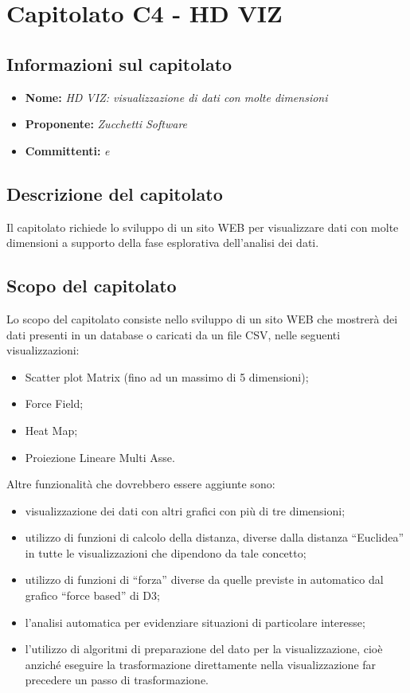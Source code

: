 \section{Capitolato C4 - HD VIZ}
\subsection{Informazioni sul capitolato}
\begin{itemize}
	\item \textbf{Nome:} \textit{HD VIZ: visualizzazione di dati con molte dimensioni}
	\item \textbf{Proponente:} \textit{Zucchetti Software}
	\item \textbf{Committenti:} \textit{\VT{} e \CR{}}
\end{itemize}

\subsection{Descrizione del capitolato}
Il capitolato richiede lo sviluppo di un sito WEB per visualizzare dati con molte dimensioni a supporto della fase esplorativa dell'analisi dei dati.

\subsection{Scopo del capitolato}
Lo scopo del capitolato consiste nello sviluppo di un sito WEB che mostrerà dei dati presenti in un database o caricati da un file CSV, nelle seguenti visualizzazioni:
\begin{itemize}
	\item Scatter plot Matrix (fino ad un massimo di 5 dimensioni);
	\item Force Field;
	\item Heat Map;
	\item Proiezione Lineare Multi Asse.
\end{itemize}
Altre funzionalità che dovrebbero essere aggiunte sono:
\begin{itemize}
	\item visualizzazione dei dati con altri grafici con più di tre dimensioni;
	\item utilizzo di funzioni di calcolo della distanza, diverse dalla distanza “Euclidea” in tutte le visualizzazioni che dipendono da tale concetto;
	\item utilizzo di funzioni di “forza” diverse da quelle previste in automatico dal grafico “force based” di D3;
	\item l'analisi automatica per evidenziare situazioni di particolare interesse;
	\item l'utilizzo di algoritmi di preparazione del dato per la visualizzazione, cioè anziché eseguire la trasformazione direttamente nella visualizzazione far precedere un passo di trasformazione.
\end{itemize}

